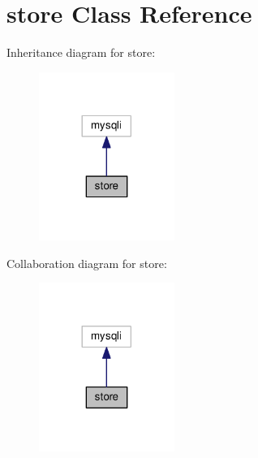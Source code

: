 \hypertarget{classstore}{}\section{store Class Reference}
\label{classstore}


Inheritance diagram for store\+:
\nopagebreak
\begin{figure}[H]
\begin{center}
\leavevmode
\includegraphics[width=125pt]{classstore__inherit__graph}
\end{center}
\end{figure}


Collaboration diagram for store\+:
\nopagebreak
\begin{figure}[H]
\begin{center}
\leavevmode
\includegraphics[width=125pt]{classstore__coll__graph}
\end{center}
\end{figure}

